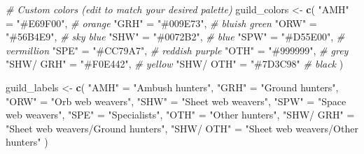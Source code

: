 \documentclass[
]{article}
\newenvironment{Shaded}{\begin{snugshade}}{\end{snugshade}}
\newcommand{\CommentTok}[1]{\textcolor[rgb]{0.56,0.35,0.01}{\textit{#1}}}
\newcommand{\FunctionTok}[1]{\textcolor[rgb]{0.13,0.29,0.53}{\textbf{#1}}}
\newcommand{\NormalTok}[1]{#1}
\newcommand{\OtherTok}[1]{\textcolor[rgb]{0.56,0.35,0.01}{#1}}
\newcommand{\StringTok}[1]{\textcolor[rgb]{0.31,0.60,0.02}{#1}}
\begin{document}
\begin{Shaded}
\begin{Highlighting}[]
\CommentTok{\# Custom colors (edit to match your desired palette)}
\NormalTok{guild\_colors }\OtherTok{\textless{}{-}} \FunctionTok{c}\NormalTok{(}
  \StringTok{"AMH"} \OtherTok{=} \StringTok{"\#E69F00"}\NormalTok{,     }\CommentTok{\# orange}
  \StringTok{"GRH"} \OtherTok{=} \StringTok{"\#009E73"}\NormalTok{,     }\CommentTok{\# bluish green}
  \StringTok{"ORW"} \OtherTok{=} \StringTok{"\#56B4E9"}\NormalTok{,     }\CommentTok{\# sky blue}
  \StringTok{"SHW"} \OtherTok{=} \StringTok{"\#0072B2"}\NormalTok{,     }\CommentTok{\# blue}
  \StringTok{"SPW"} \OtherTok{=} \StringTok{"\#D55E00"}\NormalTok{,     }\CommentTok{\# vermillion}
  \StringTok{"SPE"} \OtherTok{=} \StringTok{"\#CC79A7"}\NormalTok{,     }\CommentTok{\# reddish purple}
  \StringTok{"OTH"} \OtherTok{=} \StringTok{"\#999999"}\NormalTok{,     }\CommentTok{\# grey}
  \StringTok{"SHW/ GRH"} \OtherTok{=} \StringTok{"\#F0E442"}\NormalTok{, }\CommentTok{\# yellow}
  \StringTok{"SHW/ OTH"} \OtherTok{=} \StringTok{"\#7D3C98"}  \CommentTok{\# black}
\NormalTok{)}

\NormalTok{guild\_labels }\OtherTok{\textless{}{-}} \FunctionTok{c}\NormalTok{(}
  \StringTok{"AMH"} \OtherTok{=} \StringTok{"Ambush hunters"}\NormalTok{,}
  \StringTok{"GRH"} \OtherTok{=} \StringTok{"Ground hunters"}\NormalTok{,}
  \StringTok{"ORW"} \OtherTok{=} \StringTok{"Orb web weavers"}\NormalTok{,}
  \StringTok{"SHW"} \OtherTok{=} \StringTok{"Sheet web weavers"}\NormalTok{,}
  \StringTok{"SPW"} \OtherTok{=} \StringTok{"Space web weavers"}\NormalTok{,}
  \StringTok{"SPE"} \OtherTok{=} \StringTok{"Specialists"}\NormalTok{,}
  \StringTok{"OTH"} \OtherTok{=} \StringTok{"Other hunters"}\NormalTok{,}
  \StringTok{"SHW/ GRH"} \OtherTok{=} \StringTok{"Sheet web weavers/Ground hunters"}\NormalTok{,}
  \StringTok{"SHW/ OTH"} \OtherTok{=} \StringTok{"Sheet web weavers/Other hunters"}
\NormalTok{)}



\end{Highlighting}
\end{Shaded}
\end{document}
